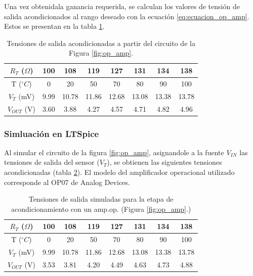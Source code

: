 \documentclass[journal,trans]{IEEEtran}
\begin{document}
Una vez obtenidala ganancia requerida, se calculan los valores de tensión de salida acondicionados al rango deseado con la ecuación \ref{eq:ecuacion_op_amp}. Estos se presentan en la tabla \ref{tab:tensiones_salida_acondicionados}.

\begin{table}[htb]
    \begin{center}
        \caption{Tensiones de salida acondicionadas a partir del circuito de la Figura \ref{fig:op_amp}.}
        \label{tab:tensiones_salida_acondicionados}
        \begin{tabular}{c | c | c | c | c | c | c | c}
            \hline
            $R_{T}$ ($\Omega$) & 100 & 108 & 119 & 127 & 131 & 134 & 138 \\
            \hline
            T ($^{\circ}C$) & 0 & 20 & 50 & 70 & 80 & 90 & 100 \\
            \hline
            $V_{T}$ (mV) & 9.99 & 10.78 & 11.86 & 12.68 & 13.08 & 13.38 & 13.78 \\
            \hline
            $V_{OUT}$ (V) & 3.60 & 3.88 & 4.27 & 4.57 & 4.71 & 4.82 & 4.96 \\
            \hline
        \end{tabular}
    \end{center}
\end{table}

\subsubsection{Simluación en LTSpice}

Al simular el circuito de la figura \ref{fig:op_amp}, asignandole a la fuente $V_{IN}$ las tensiones de salida del sensor ($V_{T}$), se obtienen las siguientes tensiones acondicionadas (tabla \ref{tab:tensiones_salida_simuladas_op_amp}). El modelo del amplificador operacional utilizado corresponde al OP07 de Analog Devices.

\begin{table}[htb]
    \begin{center}
        \caption{Tensiones de salida simuladas para la etapa de acondicionamiento con un amp.op. (Figura \ref{fig:op_amp}.)}
        \label{tab:tensiones_salida_simuladas_op_amp}
        \begin{tabular}{c | c | c | c | c | c | c | c}
            \hline
            $R_{T}$ ($\Omega$) & 100 & 108 & 119 & 127 & 131 & 134 & 138 \\
            \hline
            T ($^{\circ}C$) & 0 & 20 & 50 & 70 & 80 & 90 & 100 \\
            \hline
            $V_{T}$ (mV) & 9.99 & 10.78 & 11.86 & 12.68 & 13.08 & 13.38 & 13.78 \\
            \hline
            $V_{OUT}$ (V) & 3.53 & 3.81 & 4.20 & 4.49 & 4.63 & 4.73 & 4.88 \\
            \hline
        \end{tabular}
    \end{center}
\end{table}
\end{document}
